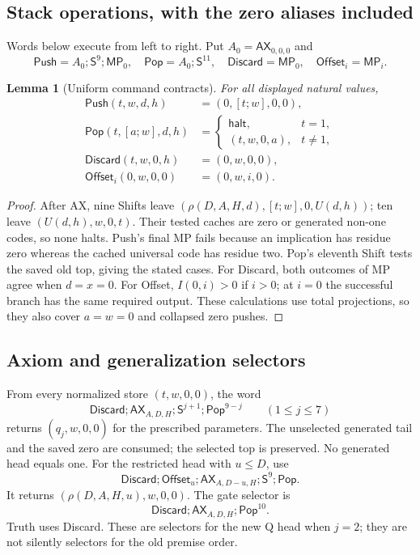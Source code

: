 \documentclass[11pt,letterpaper]{article}
\newtheorem{lemma}[theorem]{Lemma}
\begin{document}
\subsection{Stack operations, with the zero aliases included}

Words below execute from left to right. Put $A_0=\mathsf{AX}_{0,0,0}$ and
\[
 \mathsf{Push}=A_0;\mathsf S^9;\mathsf{MP}_0,\quad
 \mathsf{Pop}=A_0;\mathsf S^{11},\quad
 \mathsf{Discard}=\mathsf{MP}_0,\quad
 \mathsf{Offset}_i=\mathsf{MP}_i.
\]
\begin{lemma}[Uniform command contracts]\label{lem:words}
For all displayed natural values,
\begin{align*}
 \mathsf{Push}(t,w,d,h)&=(0,[t;w],0,0),\\
 \mathsf{Pop}(t,[a;w],d,h)&=
 \begin{cases}\mathsf{halt},&t=1,\\(t,w,0,a),&t\ne1,
 \end{cases}\\
 \mathsf{Discard}(t,w,0,h)&=(0,w,0,0),\\
 \mathsf{Offset}_i(0,w,0,0)&=(0,w,i,0).
\end{align*}
\end{lemma}
\begin{proof}
After AX, nine Shifts leave
$(\rho(D,A,H,d),[t;w],0,U(d,h))$; ten leave
$(U(d,h),w,0,t)$. Their tested caches are zero or generated non-one
codes, so none halts. Push's final MP fails because an implication has
residue zero whereas the cached universal code has residue two.
Pop's eleventh Shift tests the saved old top, giving the stated cases.
For Discard, both outcomes of MP agree when $d=x=0$.
For Offset, $I(0,i)>0$ if $i>0$; at $i=0$ the successful branch has
the same required output. These calculations use total projections,
so they also cover $a=w=0$ and collapsed zero pushes.
\end{proof}

\subsection{Axiom and generalization selectors}

From every normalized store $(t,w,0,0)$, the word
\[
 \mathsf{Discard};\mathsf{AX}_{A,D,H};
           \mathsf S^{j+1};\mathsf{Pop}^{9-j}\qquad(1\le j\le7)
\]
returns $(q_j,w,0,0)$ for the prescribed parameters. The unselected
generated tail and the saved zero are consumed; the selected top is
preserved. No generated head equals one. For the restricted head with
$u\le D$, use
\[
 \mathsf{Discard};\mathsf{Offset}_u;
 \mathsf{AX}_{A,D-u,H};\mathsf S^9;\mathsf{Pop}.
\]
It returns $(\rho(D,A,H,u),w,0,0)$. The gate selector is
\[
 \mathsf{Discard};\mathsf{AX}_{A,D,H};\mathsf{Pop}^{10}.
\]
Truth uses Discard. These are selectors for the new Q head when
$j=2$; they are not silently selectors for the old premise order.
\end{document}
